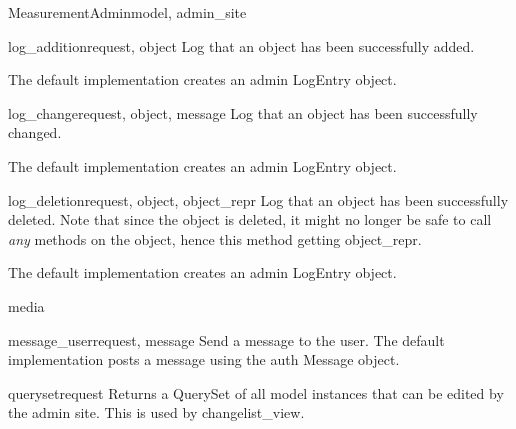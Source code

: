 \documentclass[letterpaper,10pt,english]{sphinxmanual}
\begin{document}
\begin{classdesc}{MeasurementAdmin}{model, admin\_site}
\hypertarget{data.admin.MeasurementAdmin.log_addition}{}\begin{methoddesc}{log\_addition}{request, object}
Log that an object has been successfully added.

The default implementation creates an admin LogEntry object.
\end{methoddesc}

\hypertarget{data.admin.MeasurementAdmin.log_change}{}\begin{methoddesc}{log\_change}{request, object, message}
Log that an object has been successfully changed.

The default implementation creates an admin LogEntry object.
\end{methoddesc}

\hypertarget{data.admin.MeasurementAdmin.log_deletion}{}\begin{methoddesc}{log\_deletion}{request, object, object\_repr}
Log that an object has been successfully deleted. Note that since the
object is deleted, it might no longer be safe to call \emph{any} methods
on the object, hence this method getting object\_repr.

The default implementation creates an admin LogEntry object.
\end{methoddesc}

\hypertarget{data.admin.MeasurementAdmin.media}{}\begin{memberdesc}{media}\end{memberdesc}

\hypertarget{data.admin.MeasurementAdmin.message_user}{}\begin{methoddesc}{message\_user}{request, message}
Send a message to the user. The default implementation
posts a message using the auth Message object.
\end{methoddesc}

\hypertarget{data.admin.MeasurementAdmin.queryset}{}\begin{methoddesc}{queryset}{request}
Returns a QuerySet of all model instances that can be edited by the
admin site. This is used by changelist\_view.
\end{methoddesc}


\end{classdesc}
\end{document}
